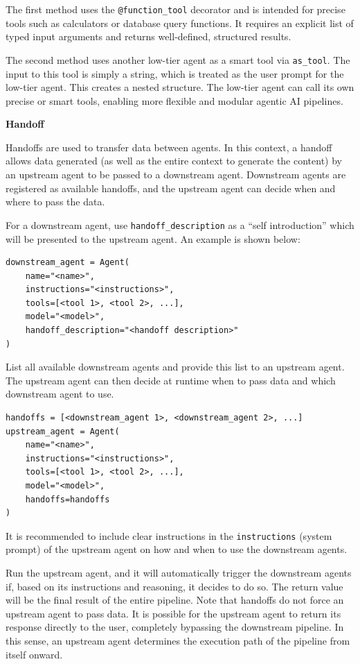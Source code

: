 The first method uses the \verb|@function_tool| decorator and is intended for precise tools such as calculators or database query functions. It requires an explicit list of typed input arguments and returns well-defined, structured results.

The second method uses another low-tier agent as a smart tool via \verb|as_tool|. The input to this tool is simply a string, which is treated as the user prompt for the low-tier agent. This creates a nested structure. The low-tier agent can call its own precise or smart tools, enabling more flexible and modular agentic AI pipelines.

\vspace{0.1in}
\noindent \textbf{Handoff}
\vspace{0.1in}

Handoffs are used to transfer data between agents. In this context, a handoff allows data generated (as well as the entire context to generate the content) by an upstream agent to be passed to a downstream agent. Downstream agents are registered as available handoffs, and the upstream agent can decide when and where to pass the data.

For a downstream agent, use \verb|handoff_description| as a ``self introduction'' which will be presented to the upstream agent. An example is shown below:
\begin{lstlisting}
downstream_agent = Agent(
    name="<name>",
    instructions="<instructions>",
    tools=[<tool 1>, <tool 2>, ...],
    model="<model>",
    handoff_description="<handoff description>"
)
\end{lstlisting}

List all available downstream agents and provide this list to an upstream agent. The upstream agent can then decide at runtime when to pass data and which downstream agent to use.
\begin{lstlisting}
handoffs = [<downstream_agent 1>, <downstream_agent 2>, ...]
upstream_agent = Agent(
    name="<name>",
    instructions="<instructions>",
    tools=[<tool 1>, <tool 2>, ...],
    model="<model>",
    handoffs=handoffs
)
\end{lstlisting}

It is recommended to include clear instructions in the \verb|instructions| (system prompt) of the upstream agent on how and when to use the downstream agents.

Run the upstream agent, and it will automatically trigger the downstream agents if, based on its instructions and reasoning, it decides to do so. The return value will be the final result of the entire pipeline. Note that handoffs do not force an upstream agent to pass data. It is possible for the upstream agent to return its response directly to the user, completely bypassing the downstream pipeline. In this sense, an upstream agent determines the execution path of the pipeline from itself onward.

